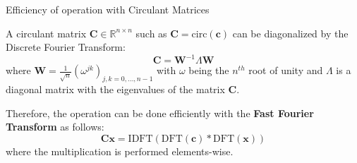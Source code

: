 \documentclass[9pt]{beamer}
\begin{document}
\begin{frame}{Efficiency of operation with Circulant Matrices}
    
    A circulant matrix $\mathbf{C} \in \mathbb{R}^{n \times n}$ such as $\mathbf{C} = \text{circ}(\mathbf{c})$ can be diagonalized by the Discrete Fourier Transform:
    \begin{equation*}
        \mathbf{C} = \mathbf{W}^{-1} \Lambda \mathbf{W}
    \end{equation*}
    where $\mathbf{W} = \frac{1}{\sqrt{n}} \left( \omega^{jk} \right)_{j,k = 0, \dots, n-1}$ with $\omega$ being the $n^{th}$ root of unity and $\Lambda$ is a diagonal matrix with the eigenvalues of the matrix $\mathbf{C}$. \\ \vspace{0.8cm}
    
    Therefore, the operation can be done efficiently with the \textbf{Fast Fourier Transform} as follows:
    \begin{equation*}
        \mathbf{C}\mathbf{x} = \text{IDFT}( \text{DFT}(\mathbf{c}) * \text{DFT}(\mathbf{x}) )
    \end{equation*}
    where the multiplication is performed elements-wise. 
\end{frame}



\end{document}
